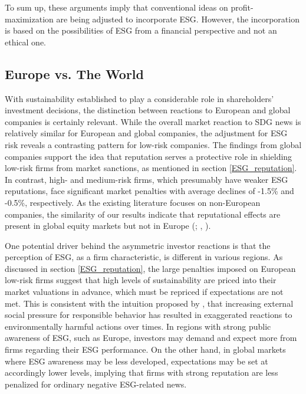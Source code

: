 To sum up, these arguments imply that conventional ideas on profit-maximization are being adjusted to incorporate ESG. However, the incorporation is based on the possibilities of ESG from a financial perspective and not an ethical one. 

\subsection{Europe vs. The World} \label{sec: discussion_Europe}

With sustainability established to play a considerable role in shareholders' investment decisions, the distinction between reactions to European and global companies is certainly relevant. While the overall market reaction to SDG news is relatively similar for European and global companies, the adjustment for ESG risk reveals a contrasting pattern for low-risk companies. The findings from global companies support the idea that reputation serves a protective role in shielding low-risk firms from market sanctions, as mentioned in section \ref{ESG_reputation}. In contrast, high- and medium-risk firms, which presumably have weaker ESG reputations, face significant market penalties with average declines of -1.5\% and -0.5\%, respectively. As the existing literature focuses on non-European companies, the similarity of our results indicate that reputational effects are present in global equity markets but not in Europe (\cite{godfrey2009relationship}; \cite{Blancard_ESG_sentiment}, \cite{flammer2013corporate}).

One potential driver behind the asymmetric investor reactions is that the perception of ESG, as a firm characteristic, is different in various regions. As discussed in section \ref{ESG_reputation}, the large penalties imposed on European low-risk firms suggest that high levels of sustainability are priced into their market valuations in advance, which must be repriced if expectations are not met. This is consistent with the intuition proposed by \cite{flammer2013corporate}, that increasing external social pressure for responsible behavior has resulted in exaggerated reactions to environmentally harmful actions over times. In regions with strong public awareness of ESG, such as Europe, investors may demand and expect more from firms regarding their ESG performance. On the other hand, in global markets where ESG awareness may be less developed, expectations may be set at accordingly lower levels, implying that firms with strong reputation are less penalized for ordinary negative ESG-related news. 

